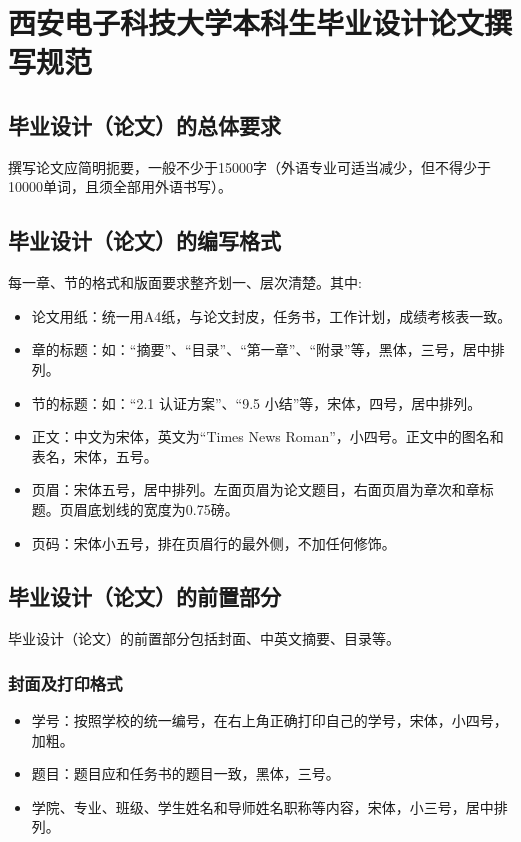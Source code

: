 
\chapter[本科生毕业设计论文撰写规范]{西安电子科技大学本科生毕业设计论文撰写规范}
\label{chap:requires}
\section{毕业设计（论文）的总体要求}
撰写论文应简明扼要，一般不少于15000字（外语专业可适当减少，但不得少于10000单词，且须全部用外语书写）。

\section{毕业设计（论文）的编写格式}
每一章、节的格式和版面要求整齐划一、层次清楚。其中:
\begin{itemize}
  \item 论文用纸：统一用A4纸，与论文封皮，任务书，工作计划，成绩考核表一致。
  \item 章的标题：如：``摘要''、``目录''、``第一章''、``附录''等，黑体，三号，居中排列。
  \item 节的标题：如：``2.1  认证方案''、``9.5  小结''等，宋体，四号，居中排列。
  \item 正文：中文为宋体，英文为``Times News Roman''，小四号。正文中的图名和表名，宋体，五号。
  \item 页眉：宋体五号，居中排列。左面页眉为论文题目，右面页眉为章次和章标题。页眉底划线的宽度为0.75磅。
  \item 页码：宋体小五号，排在页眉行的最外侧，不加任何修饰。
\end{itemize}

\section{毕业设计（论文）的前置部分}
毕业设计（论文）的前置部分包括封面、中英文摘要、目录等。
\subsection{封面及打印格式}
\begin{itemize}
  \item 学号：按照学校的统一编号，在右上角正确打印自己的学号，宋体，小四号，加粗。
  \item 题目：题目应和任务书的题目一致，黑体，三号。
  \item 学院、专业、班级、学生姓名和导师姓名职称等内容，宋体，小三号，居中排列。
\end{itemize}

